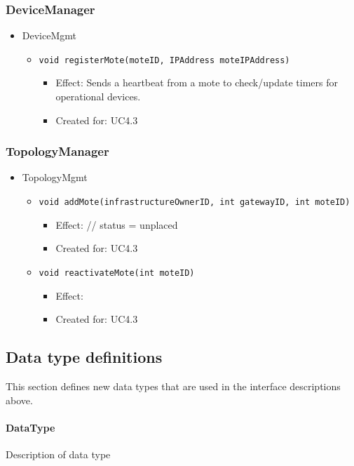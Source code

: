     \subsubsection{DeviceManager}
        \begin{itemize}
        	\item DeviceMgmt
        	\begin{itemize}
        		\item \texttt{void registerMote(moteID, IPAddress moteIPAddress)}
        		\begin{itemize}
        			\item Effect: Sends a heartbeat from a mote to check/update timers for operational devices.
        			\item Created for: UC4.3
        		\end{itemize}
        	\end{itemize}
        \end{itemize}

    \subsubsection{TopologyManager}
        \begin{itemize}
        	\item TopologyMgmt
        	\begin{itemize}
        		\item \texttt{void addMote(infrastructureOwnerID, int gatewayID, int moteID)}
        		\begin{itemize}
        			\item Effect: // status = unplaced
        			\item Created for: UC4.3
        		\end{itemize}
                \item \texttt{void reactivateMote(int moteID)}
                    \begin{itemize}
                        \item Effect:
                        \item Created for: UC4.3
                    \end{itemize}
        	\end{itemize}
        \end{itemize}

\subsection{Data type definitions}
    This section defines new data types that are used in the interface descriptions above.

    \paragraph{DataType}
        Description of data type

